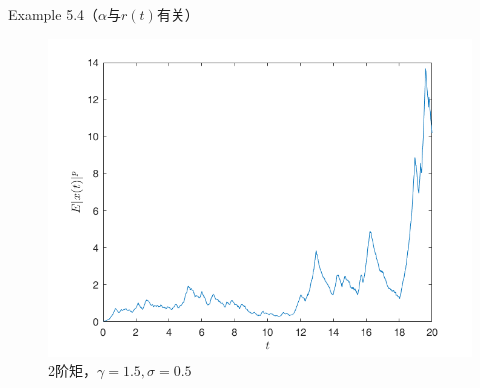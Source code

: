 \documentclass[10pt,aspectratio=43]{beamer}
\begin{document}
\begin{frame}{Example 5.4（$ \alpha $与$ r(t) $有关）
}
\begin{figure}
\centering
\includegraphics[width=0.7\linewidth]{../figures/10}
\caption{2阶矩，$ \gamma=1.5,\sigma=0.5 $}
\end{figure}
\end{frame}
\end{document}
